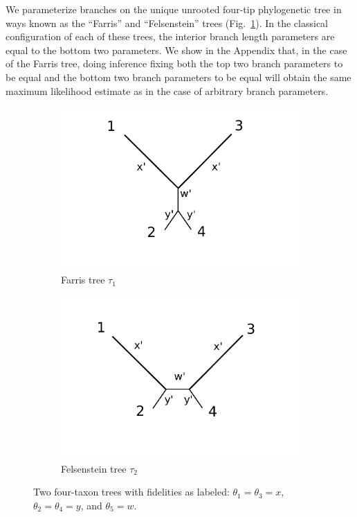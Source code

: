 \documentclass{article}
\begin{document}
We parameterize branches on the unique unrooted four-tip phylogenetic tree in ways known as the ``Farris'' and ``Felsenstein'' trees (Fig.~\ref{fig:farris-fels-top}).
In the classical configuration of each of these trees, the interior branch length parameters are equal to the bottom two parameters.
We show in the Appendix that, in the case of the Farris tree, doing inference fixing both the top two branch parameters to be equal and the bottom two branch parameters to be equal will obtain the same maximum likelihood estimate as in the case of arbitrary branch parameters.

\begin{figure}
\centering
\begin{subfigure}{.45\linewidth}
\centering
\includegraphics[width=\textwidth]{farris_blank}
\caption[short]{Farris tree $\tau_1$}
\end{subfigure}
\begin{subfigure}{.45\linewidth}
\centering
\includegraphics[width=\textwidth]{felsenstein_blank}
\caption[short]{Felsenstein tree $\tau_2$}
\end{subfigure}
\caption{Two four-taxon trees with fidelities as labeled: $\theta_1=\theta_3=x$, $\theta_2=\theta_4=y$, and $\theta_5=w$.
}
\label{fig:farris-fels-top}
\end{figure}
\end{document}
